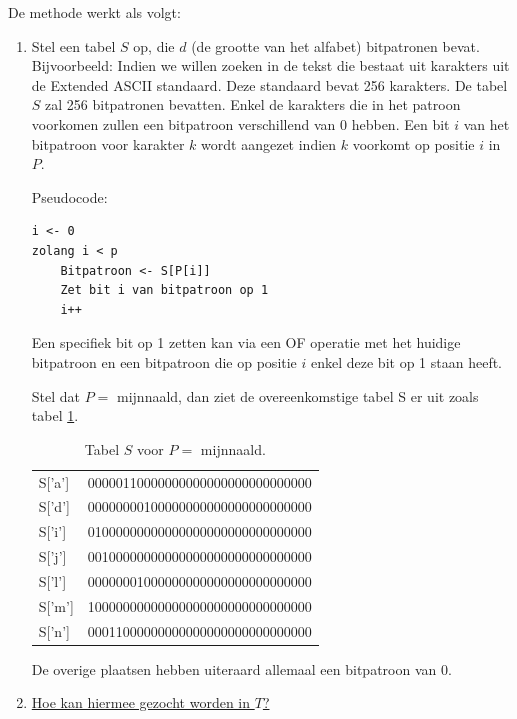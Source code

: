 \documentclass{report}
\begin{document}
De methode werkt als volgt:
\begin{enumerate}
	\item Stel een tabel $S$ op, die $d$ (de grootte van het alfabet) bitpatronen bevat. Bijvoorbeeld: Indien we willen zoeken in de tekst die bestaat uit karakters uit de Extended ASCII standaard. Deze standaard bevat 256 karakters. De tabel $S$ zal 256 bitpatronen bevatten. Enkel de karakters die in het patroon voorkomen zullen een bitpatroon verschillend van 0 hebben. Een bit $i$ van het bitpatroon voor karakter $k$ wordt aangezet indien $k$ voorkomt op positie $i$ in $P$. 
	
	Pseudocode:
	\begin{lstlisting}
i <- 0
zolang i < p
	Bitpatroon <- S[P[i]]
	Zet bit i van bitpatroon op 1
	i++
	\end{lstlisting}

	Een specifiek bit op 1 zetten kan via een OF operatie met het huidige bitpatroon en een bitpatroon die op positie $i$ enkel deze bit op 1 staan heeft.

	Stel dat $P = $ mijnnaald, dan ziet de overeenkomstige tabel S er uit zoals tabel \ref{table:shiftand}.
	\begin{table}[ht]
		\centering
		\begin{tabular}{l l}
			S['a'] & 00000110000000000000000000000000 \\
			S['d'] & 00000000100000000000000000000000 \\
			S['i'] & 01000000000000000000000000000000 \\
			S['j'] & 00100000000000000000000000000000 \\
			S['l'] & 00000001000000000000000000000000 \\
			S['m'] & 10000000000000000000000000000000 \\
			S['n'] & 00011000000000000000000000000000 \\	
		\end{tabular}
		\caption{Tabel $S$ voor $P = $ mijnnaald.}
		\label{table:shiftand}
	\end{table}
	De overige plaatsen hebben uiteraard allemaal een bitpatroon van 0. 
	\item \underline{Hoe kan hiermee gezocht worden in $T$?}
	

\end{enumerate}
\end{document}
